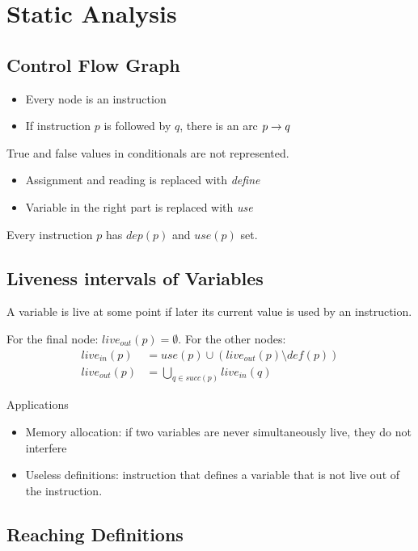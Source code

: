 \section{Static Analysis}

\subsection{Control Flow Graph}
\begin{itemize}
    \item Every node is an instruction
    \item If instruction $p$ is followed by $q$, there is an arc $p\rightarrow q$
\end{itemize}

True and false values in conditionals are not represented.
\begin{itemize}
    \item Assignment and reading is replaced with \emph{define}
    \item Variable in the right part is replaced with \emph{use}
\end{itemize}

Every instruction $p$ has $dep(p)$ and $use(p)$ set.

\subsection{Liveness intervals of Variables}
A variable is live at some point if later its current value is used by an instruction.

For the final node: $live_{out}(p) = \emptyset$. For the other nodes:
\begin{align*}
    live_{in}(p) &= use(p) \cup (live_{out}(p) \setminus def(p)) \\
    live_{out}(p) &= \bigcup_{q\in succ(p)} live_{in}(q)
\end{align*}

Applications
\begin{itemize}
    \item Memory allocation: if two variables are never simultaneously live, they do not interfere
    \item Useless definitions: instruction that defines a variable that is not live out of the instruction.
\end{itemize}

\subsection{Reaching Definitions}

